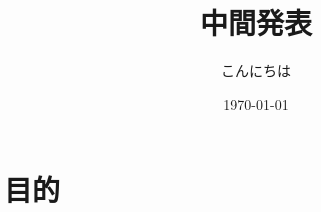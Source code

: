 \documentclass[a4j,10pt]{jsarticle}
\title{中間発表}
\author{こんにちは}
\date{\today}
\begin{document}
\maketitle


\section{目的}
\end{document}
